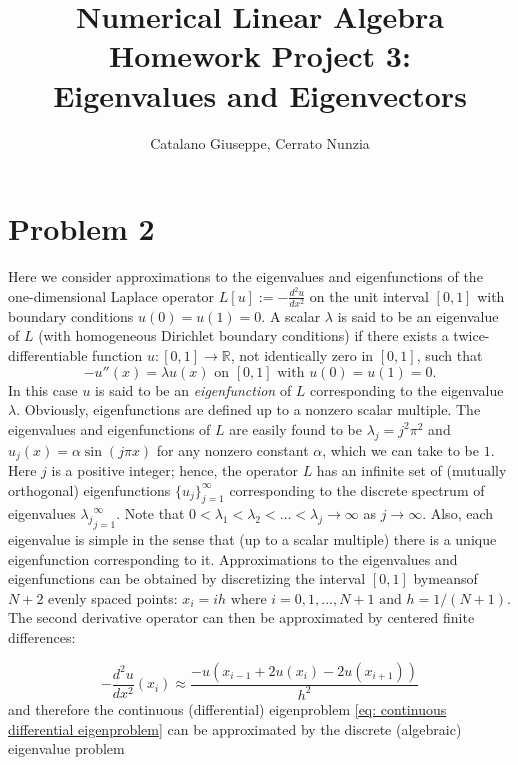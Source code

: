 \documentclass[a4paper,11pt]{article}
\newcommand{\R}{\mathbb{R}}
\begin{document}
	\author{Catalano Giuseppe, Cerrato Nunzia}
	\title{Numerical Linear Algebra Homework Project 3:\\Eigenvalues and Eigenvectors}
	\date{}
	\maketitle
	
\section*{Problem 2}	
Here we consider approximations to the eigenvalues and eigenfunctions of the one-dimensional Laplace operator 
$L[u] := - \frac{d^2 u }{dx^2}$ on the unit interval $[0,1]$ with boundary conditions $u(0) = u(1) = 0$. A scalar $\lambda$ is said to be an eigenvalue of $L$ (with homogeneous Dirichlet boundary conditions) if there exists a twice-differentiable function $u : [0, 1] \rightarrow \R$, not identically zero in $[0, 1]$, such that
\begin{equation}\label{eq: continuous differential eigenproblem}
	-u''(x) = \lambda u(x) \text{ on } [0,1] \text{ with } u(0) = u(1) = 0.
\end{equation}
In this case $u$ is said to be an \textit{eigenfunction} of $L$ corresponding to the eigenvalue $\lambda$. Obviously, eigenfunctions are defined up to a nonzero scalar multiple.
The eigenvalues and eigenfunctions of $L$ are easily found to be $\lambda_j = j^2\pi^2$ and $u_j(x) = \alpha \sin(j\pi x)$ for any nonzero constant $\alpha$, which we can take to be $1$. Here $j$ is a positive integer; hence, the operator $L$ has an infinite set of (mutually orthogonal) eigenfunctions $\{u_j\}_{j=1}^\infty $ corresponding to the discrete spectrum of eigenvalues ${\lambda_j}_{j=1}^\infty $. Note that $0 < \lambda_1 < \lambda_2 < \dots < \lambda_j \rightarrow \infty$ as $j \rightarrow \infty$. Also, each eigenvalue is simple in the sense that (up to a scalar multiple) there is a unique eigenfunction corresponding to it. Approximations to the eigenvalues and eigenfunctions can be obtained by discretizing the interval $[0, 1]$ bymeansof $N+2$ evenly spaced points: $x_i =ih \text{ where } i=0,1,...,N+1 \text{ and } h=1/(N+1)$. The second derivative operator can then be approximated by centered finite differences:
	
\begin{equation}
	-\frac{d^2u}{dx^2}(x_i) \approx \frac{-u(x_{i-1} + 2 u(x_i)  -2 u(x_{i+1}) )}{h^2}
\end{equation}
and therefore the continuous (differential) eigenproblem \eqref{eq: continuous differential eigenproblem} can be approximated by the discrete (algebraic) eigenvalue problem 
\end{document}
